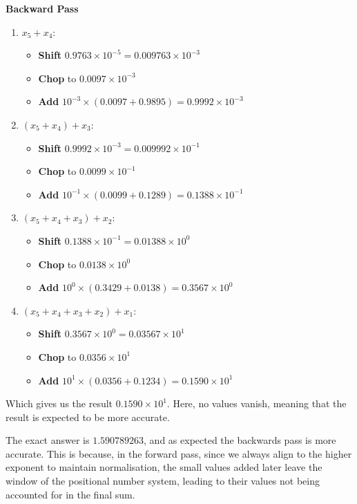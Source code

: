 \textbf{Backward Pass}
\begin{enumerate}
	\item $x_5 + x_4$: \begin{itemize}
		\item \textbf{Shift} $0.9763 \times 10^{-5} = 0.009763 \times 10^{-3}$
		\item \textbf{Chop} to $0.0097 \times 10^{-3}$
		\item \textbf{Add} $10^{-3} \times (0.0097 + 0.9895) = 0.9992 \times 10^{-3}$
	\end{itemize}

	\item $(x_5 + x_4) + x_3$: \begin{itemize}
		\item \textbf{Shift} $0.9992 \times 10^{-3} = 0.009992 \times 10^{-1}$
		\item \textbf{Chop} to $0.0099 \times 10^{-1}$
		\item \textbf{Add} $10^{-1} \times (0.0099 + 0.1289) = 0.1388 \times 10^{-1}$
	\end{itemize}

	\item $(x_5 + x_4 + x_3) + x_2$: \begin{itemize}
		\item \textbf{Shift} $0.1388 \times 10^{-1} = 0.01388 \times 10^0$
		\item \textbf{Chop} to $0.0138 \times 10^0$
		\item \textbf{Add} $10^0 \times (0.3429 + 0.0138) = 0.3567 \times 10^{0}$
	\end{itemize}

	\item $(x_5 + x_4 + x_3 + x_2) + x_1$: \begin{itemize}
		\item \textbf{Shift} $0.3567 \times 10^{0} = 0.03567 \times 10^1$
		\item \textbf{Chop} to $0.0356 \times 10^1$
		\item \textbf{Add} $10^1 \times (0.0356 + 0.1234) = 0.1590 \times 10^1$
	\end{itemize}
\end{enumerate}

Which gives us the result $0.1590 \times 10^1$. Here, no values vanish, meaning that the result is expected to be more accurate.\bigskip

The exact answer is $1.590789263$, and as expected the backwards pass is more accurate. This is because, in the forward pass, since we always align to the higher exponent to maintain normalisation, the small values added later leave the window of the positional number system, leading to their values not being accounted for in the final sum.